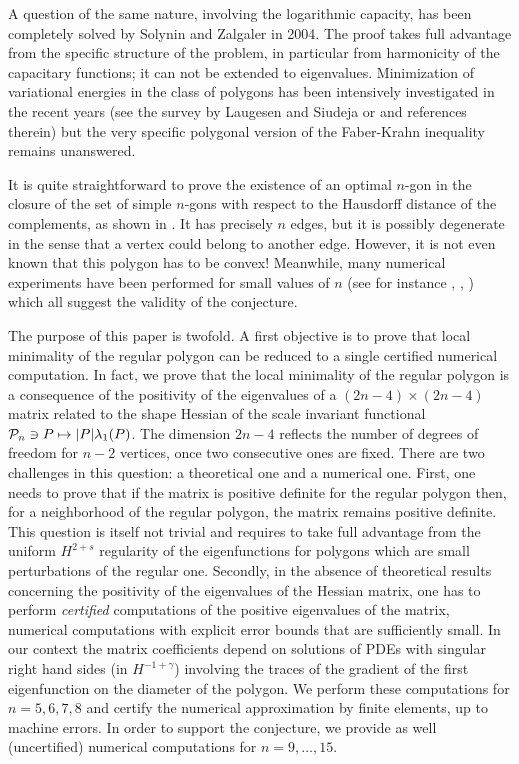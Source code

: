 \documentclass[JEP,XML,SOM,Unicode,ThmDefs,NoFloatCountersInSection,published]{cedram}
\def\mto{\mathchoice{\longmapsto}{\mapsto}{\mapsto}{\mapsto}}
\theoremstyle{plain}
\theoremstyle{definition}
\newcommand{\lb}{\lambda}
\begin{document}
A question of the same nature, involving the logarithmic capacity, has been completely solved by Solynin and Zalgaler \cite{SoZa04} in 2004. The proof takes full advantage from the specific structure of the problem, in particular from harmonicity of the capa\-citary functions; it can not be extended to eigenvalues. Minimization of variational energies in the class of polygons has been intensively investigated in the recent years (see the survey by Laugesen and Siudeja \cite{LaSi17} or \cite{BuFr21} and references therein) but the very specific polygonal version of the Faber-Krahn inequality remains unanswered.

It is quite straightforward to prove the existence of an optimal $n$-gon in the closure of the set of simple $n$-gons with respect to the Hausdorff distance of the complements, as shown in \cite[Ch.\,3]{henroteigs}. It has precisely $n$ edges, but it is possibly degenerate in the sense that a vertex could belong to another edge. However, it is not even known that this polygon has to be convex! Meanwhile, many numerical experiments have been performed for small values of $n$ (see for instance \cite{AFpolygons}, \cite[Ch.\,1]{beniphd}, \cite{nigam_numerics}) which all suggest the validity of the conjecture.

The purpose of this paper is twofold. A first objective is to prove that local minimality of the regular polygon can be reduced to a single certified numerical computation.
In fact, we prove that the local minimality of the regular polygon is a consequence of the positivity of the eigenvalues of a $(2n-4) \times (2n-4)$ matrix related to the shape Hessian of the scale invariant functional ${\mathcal P}_n \ni P \mto |P|\lb_1(P)$. The dimension $2n-4$ reflects the number of degrees of freedom for $n-2$ vertices, once two consecutive ones are fixed. There are two challenges in this question: a theoretical one and a numerical one. First, one needs to prove that if the matrix is positive definite for the regular polygon then, for a neighborhood of the regular polygon, the matrix remains positive definite. This question is itself not trivial and requires to take full advantage from the uniform $H^{2+s}$ regularity of the eigenfunctions for polygons which are small perturbations of the regular one. Secondly, in the absence of theoretical results concerning the positivity of the eigenvalues of the Hessian matrix, one has to perform {\it certified} computations of the positive eigenvalues of the matrix, \ie numerical computations with explicit error bounds that are sufficiently small. In our context the matrix coefficients depend on solutions of PDEs with singular right hand sides (in $H^{-1+ \gamma}$) involving the traces of the gradient of the first eigenfunction on the diameter of the polygon. We perform these computations for $n= 5, 6, 7, 8$ and certify the numerical approximation by finite elements, up to machine errors. In order to support the conjecture, we provide as well (uncertified) numerical computations for $n=9, \dots, 15$.
\end{document}
